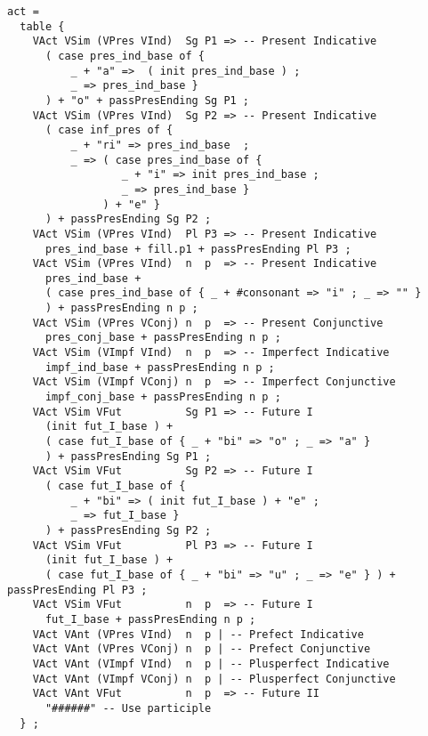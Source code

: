 \begin{lstlisting}[float=h!tp,caption={Ausschnitt aus der Funktion \texttt{mkDeponent} um Aktiv-Verbformen zu bilden (vgl. \textbf{ResLat.gf})},label={GF-Res-MkDeponent-Act},basicstyle=\small]
act = 
  table {
    VAct VSim (VPres VInd)  Sg P1 => -- Present Indicative
      ( case pres_ind_base of {
          _ + "a" =>  ( init pres_ind_base ) ;
          _ => pres_ind_base }
      ) + "o" + passPresEnding Sg P1 ;
    VAct VSim (VPres VInd)  Sg P2 => -- Present Indicative
      ( case inf_pres of {
          _ + "ri" => pres_ind_base  ;
          _ => ( case pres_ind_base of {
                  _ + "i" => init pres_ind_base ;
                  _ => pres_ind_base }
               ) + "e" }
      ) + passPresEnding Sg P2 ;
    VAct VSim (VPres VInd)  Pl P3 => -- Present Indicative
      pres_ind_base + fill.p1 + passPresEnding Pl P3 ;
    VAct VSim (VPres VInd)  n  p  => -- Present Indicative
      pres_ind_base +
      ( case pres_ind_base of { _ + #consonant => "i" ; _ => "" }
      ) + passPresEnding n p ;
    VAct VSim (VPres VConj) n  p  => -- Present Conjunctive
      pres_conj_base + passPresEnding n p ; 
    VAct VSim (VImpf VInd)  n  p  => -- Imperfect Indicative
      impf_ind_base + passPresEnding n p ;
    VAct VSim (VImpf VConj) n  p  => -- Imperfect Conjunctive
      impf_conj_base + passPresEnding n p ;
    VAct VSim VFut          Sg P1 => -- Future I
      (init fut_I_base ) + 
      ( case fut_I_base of { _ + "bi" => "o" ; _ => "a" }
      ) + passPresEnding Sg P1 ;
    VAct VSim VFut          Sg P2 => -- Future I
      ( case fut_I_base of { 
          _ + "bi" => ( init fut_I_base ) + "e" ;
          _ => fut_I_base }
      ) + passPresEnding Sg P2 ;
    VAct VSim VFut          Pl P3 => -- Future I
      (init fut_I_base ) + 
      ( case fut_I_base of { _ + "bi" => "u" ; _ => "e" } ) + passPresEnding Pl P3 ;
    VAct VSim VFut          n  p  => -- Future I
      fut_I_base + passPresEnding n p ;
    VAct VAnt (VPres VInd)  n  p | -- Prefect Indicative
    VAct VAnt (VPres VConj) n  p | -- Prefect Conjunctive
    VAct VAnt (VImpf VInd)  n  p | -- Plusperfect Indicative
    VAct VAnt (VImpf VConj) n  p | -- Plusperfect Conjunctive
    VAct VAnt VFut          n  p  => -- Future II 
      "######" -- Use participle
  } ; 
\end{lstlisting}
